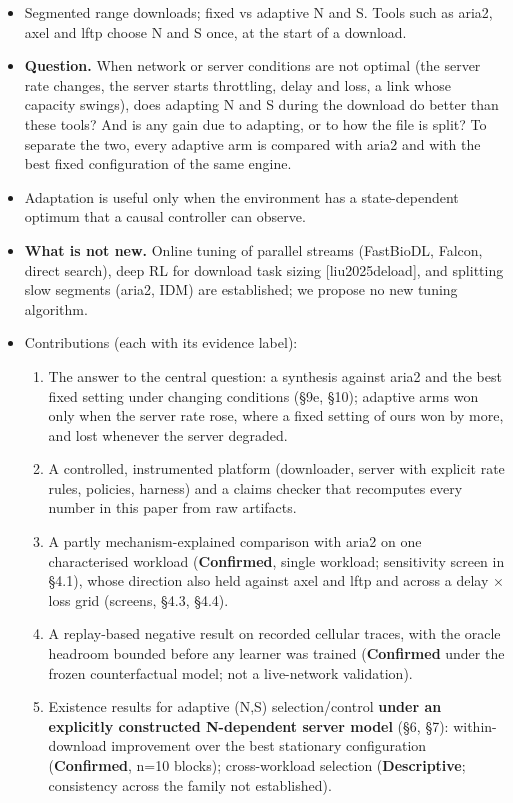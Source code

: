 \documentclass[10pt,a4paper]{article}
\begin{document}
\begin{itemize}
\item Segmented range downloads; fixed vs adaptive N and S. Tools such as aria2, axel and lftp choose N and S once, at the start of a download.
\item \textbf{Question.} When network or server conditions are not optimal (the server rate changes, the server starts throttling, delay and loss, a link whose capacity swings), does adapting N and S during the download do better than these tools? And is any gain due to adapting, or to how the file is split? To separate the two, every adaptive arm is compared with aria2 and with the best fixed configuration of the same engine.
\item Adaptation is useful only when the environment has a state-dependent optimum that a causal controller can observe.
\item \textbf{What is not new.} Online tuning of parallel streams (FastBioDL, Falcon, direct search), deep RL for download task sizing [liu2025deload], and splitting slow segments (aria2, IDM) are established; we propose no new tuning algorithm.
\item Contributions (each with its evidence label):
\begin{enumerate}
\item The answer to the central question: a synthesis against aria2 and the best fixed setting under changing conditions (§9e, §10); adaptive arms won only when the server rate rose, where a fixed setting of ours won by more, and lost whenever the server degraded.
\item A controlled, instrumented platform (downloader, server with explicit rate rules, policies, harness) and a claims checker that recomputes every number in this paper from raw artifacts.
\item A partly mechanism-explained comparison with aria2 on one characterised workload (\textbf{Confirmed}, single workload; sensitivity screen in §4.1), whose direction also held against axel and lftp and across a delay × loss grid (screens, §4.3, §4.4).
\item A replay-based negative result on recorded cellular traces, with the oracle headroom bounded before any learner was trained (\textbf{Confirmed} under the frozen counterfactual model; not a live-network validation).
\item Existence results for adaptive (N,S) selection/control \textbf{under an explicitly constructed N-dependent server model} (§6, §7): within-download improvement over the best stationary configuration (\textbf{Confirmed}, n=10 blocks); cross-workload selection (\textbf{Descriptive}; consistency across the family not established).

\end{enumerate}
\end{itemize}
\end{document}
